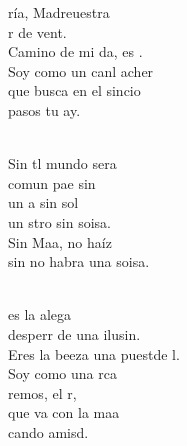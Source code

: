 \begin{cancion}%
	ría, Madreuestra\\
	r de vent.\\
	Camino de mi da,  es . \\
	Soy como un canl acher\\
	que busca en el sincio\\
	 pasos  tu ay. \\\jump\\
	\begin{chorus}%
	Sin tl mundo sera\\
	comun pae sin \\
	un a sin sol\\
	un stro sin soisa.\\
	Sin Maa, no haíz\\
	sin no habra una soisa.\\
	\end{chorus}%
	\jump\\
	es la alega \\
	desperr de una ilusin.\\
	Eres la beeza una puestde l.\\
	Soy como una rca\\
	 remos,  el r,\\
	que va con la maa\\
	cando  amisd.\\
\end{cancion}%
